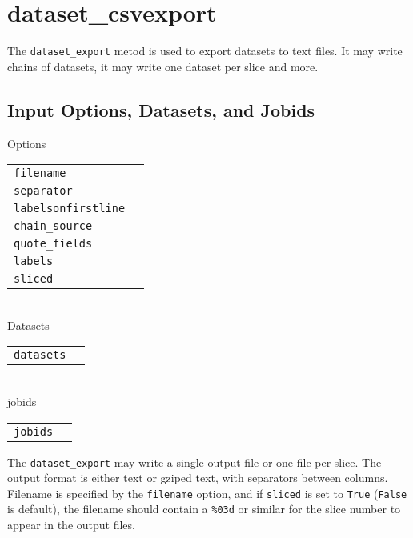 \clearpage
\section{dataset\_csvexport}

The \texttt{dataset\_export} metod is used to export datasets to text
files.  It may write chains of datasets, it may write one dataset per
slice and more.


\subsection{Input Options, Datasets, and Jobids}

\noindent Options\\

\begin{tabular}{ll}
  \texttt{filename} & \\ %
  \texttt{separator} & \\ %
  \texttt{labelsonfirstline} & \\ %
  \texttt{chain\_source} & \\ %
  \texttt{quote\_fields} & \\ %
  \texttt{labels} & \\ %
  \texttt{sliced} & \\ %
\end{tabular}\\

\noindent Datasets\\

\begin{tabular}{ll}
  \texttt{datasets} & \\ %
\end{tabular}\\

\noindent jobids\\

\begin{tabular}{ll}
  \texttt{jobids} & \\ %
\end{tabular}


The \texttt{dataset\_export} may write a single output file or one
file per slice.  The output format is either text or gziped text, with
separators between columns.  Filename is specified by the
\texttt{filename} option, and if \texttt{sliced} is set to
\texttt{True} (\texttt{False} is default), the filename should contain
a \texttt{\%03d} or similar for the slice number to appear in the
output files.

